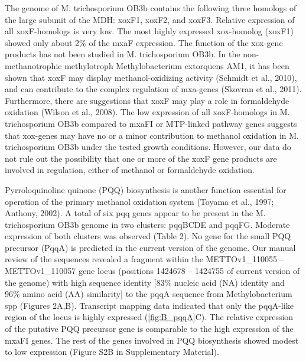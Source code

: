 The genome of M. trichosporium OB3b contains the following three homologs of the large subunit of the MDH: xoxF1, xoxF2, and xoxF3.
Relative expression of all xoxF-homologs is very low.
The most highly expressed xox-homolog (xoxF1) showed only about 2\% of the mxaF expression.
The function of the xox-gene products has not been studied in M. trichosporium OB3b.
In the non-methanotrophic methylotroph Methylobacterium extorquens AM1, it has been shown that xoxF may display methanol-oxidizing activity (Schmidt et al., 2010), and can contribute to the complex regulation of mxa-genes (Skovran et al., 2011).
Furthermore, there are suggestions that xoxF may play a role in formaldehyde oxidation (Wilson et al., 2008).
The low expression of all xoxF-homologs in M. trichosporium OB3b compared to mxaFI or MTP-linked pathway genes suggests that xox-genes may have no or a minor contribution to methanol oxidation in M. trichosporium OB3b under the tested growth conditions.
However, our data do not rule out the possibility that one or more of the xoxF gene products are involved in regulation, either of methanol or formaldehyde oxidation.

Pyrroloquinoline quinone (PQQ) biosynthesis is another function essential for operation of the primary methanol oxidation system (Toyama et al., 1997; Anthony, 2002).
A total of six pqq genes appear to be present in the M. trichosporium OB3b genome in two clusters: pqqBCDE and pqqFG.
Moderate expression of both clusters was observed (Table 2).
No gene for the small PQQ precursor (PqqA) is predicted in the current version of the genome.
Our manual review of the sequences revealed a fragment within the METTOv1\_110055 – METTOv1\_110057 gene locus (positions 1424678 – 1424755 of current version of the genome) with high sequence identity [83\% nucleic acid (NA) identity and 96\% amino acid (AA) similarity] to the pqqA sequence from Methylobacterium spp (Figures 2A,B).
Transcript mapping data indicated that only the pqqA-like region of the locus is highly expressed (\ref{fig:B_pqqA}C).
The relative expression of the putative PQQ precursor gene is comparable to the high expression of the mxaFI genes.
The rest of the genes involved in PQQ biosynthesis showed modest to low expression (Figure S2B in Supplementary Material).

